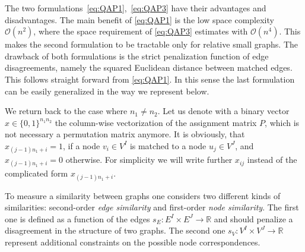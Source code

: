 The two formulations~\eqref{eq:QAP1},~\eqref{eq:QAP3} have their advantages and disadvantages. The main benefit of \eqref{eq:QAP1} is the low space complexity $\mathcal O(n^2)$, where the space requirement of \eqref{eq:QAP3} estimates with $\mathcal O(n^4)$. This makes the second formulation to be tractable only for relative small graphs. The drawback of both formulations is the strict penalization function of edge disagreements, namely the squared Euclidean distance between matched edges. This follows straight forward from \eqref{eq:QAP1}. In this sense the last formulation can be easily generalized in the way we represent below. 

We return back to the case where $n_1\not=n_2$. Let us denote with a binary vector $x\in \{0,1\}^{n_1n_2}$ the column-wise vectorization of the assignment matrix $P$, which is not necessary a permutation matrix anymore. It is obviously, that $x_{(j-1)n_1+i}=1$, if a node $v_i\in V^I$ is matched to a node $u_j\in V^J$, and $x_{(j-1)n_1+i}=0$ otherwise. For simplicity we will write further $x_{ij}$ instead of the complicated form $x_{(j-1)n_1+i}$.
 

To measure a similarity between graphs one considers two different kinds of similarities: second-order \emph{edge similarity} and first-order \emph{node similarity}. The first one is defined as a function of the edges $s_E:E^I\times E^J\rightarrow\mathbb{R}$ and should penalize a disagreement in the structure of two graphs. The second one $s_V:V^I\times V^J\rightarrow\mathbb{R}$ represent additional constraints on the possible node correspondences.


